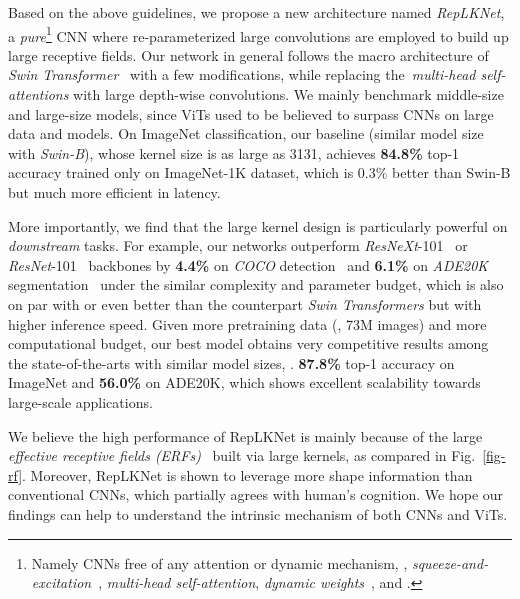 \documentclass[10pt,twocolumn,letterpaper]{article}
\begin{document}
	
	Based on the above guidelines, we propose a new architecture named \emph{RepLKNet}, a \emph{pure}\footnote{Namely CNNs free of any attention or dynamic mechanism, \eg, \emph{squeeze-and-excitation}~\cite{hu2018squeeze}, \emph{multi-head self-attention}, \emph{dynamic weights}~\cite{han2021demystifying,wu2019pay}, and \etc.} CNN where re-parameterized large convolutions are employed to build up large receptive fields. Our network in general follows the macro architecture of \emph{Swin Transformer}~\cite{swin} with a few modifications, while replacing the~\emph{multi-head self-attentions} with large depth-wise convolutions. We mainly benchmark middle-size and large-size models, since ViTs used to be believed to surpass CNNs on large data and models. On ImageNet classification, our baseline (similar model size with \emph{Swin-B}), whose kernel size is as large as 3131, achieves \textbf{84.8\%} top-1 accuracy trained only on ImageNet-1K dataset, which is 0.3\% better than Swin-B but much more efficient in latency. 
	
	
	More importantly, we find that the large kernel design is particularly powerful on \emph{downstream} tasks. For example, our networks outperform \emph{ResNeXt}-101~\cite{xie2017aggregated} or \emph{ResNet}-101~\cite{he2016deep} backbones by \textbf{4.4\%} on \emph{COCO} detection~\cite{lin2014microsoft} and \textbf{6.1\%} on \emph{ADE20K} segmentation~\cite{zhou2019semantic} under the similar complexity and parameter budget, which is also on par with or even better than the counterpart \emph{Swin Transformers} but with higher inference speed. Given more pretraining data (\eg, 73M images) and more computational budget, our best model obtains very competitive results among the state-of-the-arts with similar model sizes, \eg. \textbf{87.8\%} top-1 accuracy on ImageNet and \textbf{56.0\%} on ADE20K, which shows excellent scalability towards large-scale applications. 
	
	
	We believe the high performance of RepLKNet is mainly because of the large \emph{effective receptive fields (ERFs)}~\cite{erf} built via large kernels, as compared in Fig.~\ref{fig-rf}. Moreover, RepLKNet is shown to leverage more shape information than conventional CNNs, which partially agrees with human's cognition. We hope our findings can help to understand the intrinsic mechanism of both CNNs and ViTs.
\end{document}

